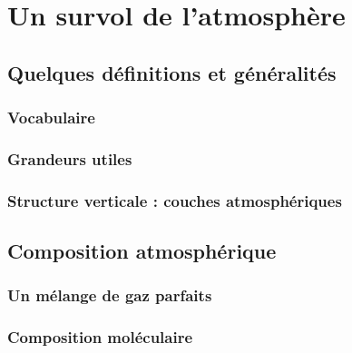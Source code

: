 \chapter{Un survol de l'atmosphère} \label{chap:int}


	\bk
	

\mk \section{Quelques définitions et généralités}

	\sk \subsection{Vocabulaire}
	

	\sk \subsection{Grandeurs utiles}
	
	

	\sk \subsection{Structure verticale : couches atmosphériques}
	
	

\mk \section{Composition atmosphérique}
	
	\sk \subsection{Un mélange de gaz parfaits}
	

	\sk \subsection{Composition moléculaire}
	
	
	
	


